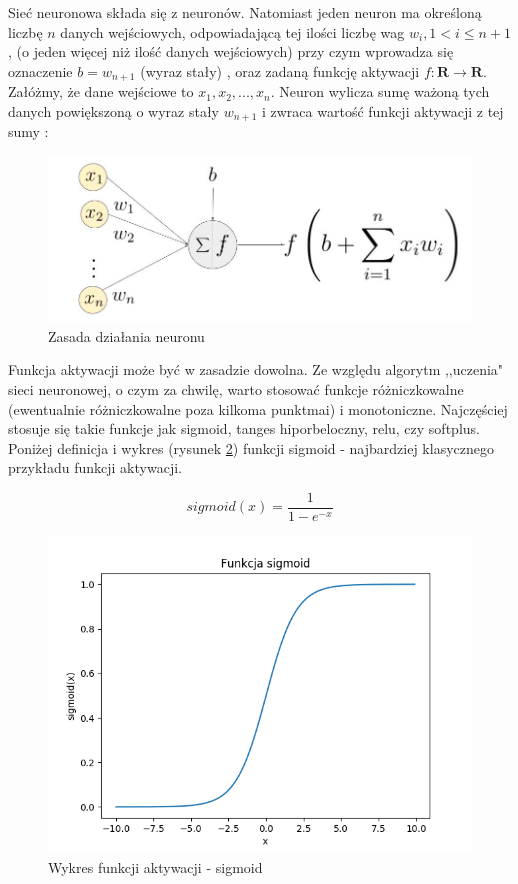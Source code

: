 \documentclass[licencjacka]{pracamgr}
\begin{document}
Sieć neuronowa składa się z neuronów. Natomiast jeden neuron ma określoną liczbę $n$ danych wejściowych, odpowiadającą tej ilości liczbę wag $w_{i}, 1 < i\leq n+1$, (o jeden więcej niż ilość danych wejściowych) przy czym wprowadza się 
oznaczenie  $b=w_{n+1}$ (wyraz stały)  , oraz zadaną funkcję aktywacji $f:\mathbf{R}\rightarrow\mathbf{R}$.  Załóżmy, że dane wejściowe to $x_{1}, x_{2},...,x_{n}$.  Neuron wylicza sumę ważoną tych danych powiększoną o wyraz stały $w_{n+1}$ i zwraca wartość funkcji aktywacji z tej sumy :

\begin{figure}[h!]
	\includegraphics [scale=0.2]{neuron.png}
	\caption{Zasada działania neuronu}
	\label{Rys20}
\end{figure}


Funkcja aktywacji może być w zasadzie dowolna. Ze względu algorytm ,,uczenia" sieci neuronowej, o czym za chwilę, warto stosować funkcje różniczkowalne (ewentualnie różniczkowalne poza kilkoma punktmai) i monotoniczne. Najczęściej stosuje się takie funkcje jak sigmoid, tanges hiporbeloczny, relu, czy softplus.  Poniżej definicja i wykres (rysunek \ref{Rys21}) funkcji sigmoid - najbardziej klasycznego przykładu funkcji aktywacji.

$$sigmoid(x) = \frac{1}{1-e^{-x}}$$
\begin{figure}[h!]
	\includegraphics [scale=0.5]{sigmoid.png}
	\caption{Wykres funkcji aktywacji - sigmoid}
	\label{Rys21}
\end{figure}
\end{document}
